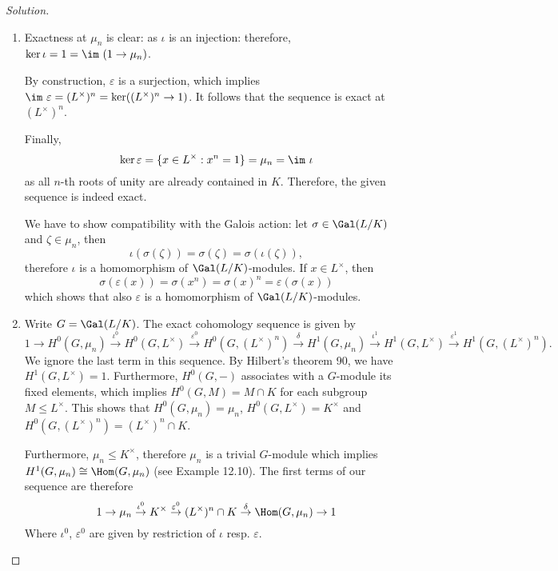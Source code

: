 \documentclass[a4paper,10pt,reqno]{amsart}
\newenvironment{sol}
  {\renewcommand\qedsymbol{$\blacksquare$}\begin{proof}[Solution]}
  {\end{proof}}
\begin{document}
\begin{sol}
    \begin{enumerate}[label=(\roman*)]

    \item Exactness at $\mu_n$ is clear: as $\iota$ is an injection: therefore, $\ker \iota = 1 = \im\ (1 \to \mu_n)$.

    By construction, $\varepsilon$ is a surjection, which implies $\im\ \varepsilon = (L^{\times})^n = \ker ( (L^{\times})^n \to 1)$. It follows that the sequence is exact at $(L^{\times})^n$.

    Finally,
    \[
    \ker \varepsilon = \{ x \in L^{\times}: x^n = 1 \} = \mu_n = \im\ \iota
    \]
    as all $n$-th roots of unity are already contained in $K$. Therefore, the given sequence is indeed exact.

    We have to show compatibility with the Galois action: let $\sigma \in \Gal(L/K)$ and $\zeta \in \mu_n$, then
    \[
    \iota(\sigma(\zeta)) = \sigma(\zeta)= \sigma(\iota(\zeta)),
    \]
    therefore $\iota$ is a homomorphism of $\Gal(L/K)$-modules. If $x \in L^{\times}$, then 
    \[
    \sigma(\varepsilon(x)) = \sigma(x^n) = \sigma(x)^n = \varepsilon(\sigma(x))
    \]
    which shows that also $\varepsilon$ is a homomorphism of $\Gal(L/K)$-modules.
    \item Write $G = \Gal(L/K)$. The exact cohomology sequence is given by
    \[
    1 \to H^0(G,\mu_n) \overset{\iota^0}{\to} H^0(G,L^{\times}) \overset{\varepsilon^0}{\to} H^0(G,(L^{\times})^n) \overset{\delta}{\to} H^1(G,\mu_n) \overset{\iota^1}{\to} H^1(G,L^{\times}) \overset{\varepsilon^1}{\to} H^1(G,(L^{\times})^n).
    \]
    We ignore the last term in this sequence. By Hilbert's theorem 90, we have $H^1(G,L^{\times}) = 1$. Furthermore, $H^0(G,-)$ associates with a $G$-module its fixed elements, which implies $H^0(G,M) = M \cap K$ for each subgroup $M \leq L^{\times}$. This shows that $H^0(G,\mu_n) = \mu_n$, $H^0(G,L^{\times}) = K^{\times}$ and $H^0(G,(L^{\times})^n) = (L^{\times})^n \cap K$.
    
    Furthermore, $\mu_n \leq K^{\times}$, therefore $\mu_n$ is a trivial $G$-module which implies $H^1(G,\mu_n) \cong \Hom(G,\mu_n)$ (see Example 12.10). The first terms of our sequence are therefore
    \[
    1 \to \mu_n \overset{\iota^0}{\to} K^{\times} \overset{\varepsilon^0}{\to} (L^{\times})^n \cap K \overset{\delta}{\to} \Hom(G,\mu_n) \to 1
    \]
    Where $\iota^0$, $\varepsilon^0$ are given by restriction of $\iota$ resp. $\varepsilon$.


\end{enumerate}
\end{sol}
\end{document}
